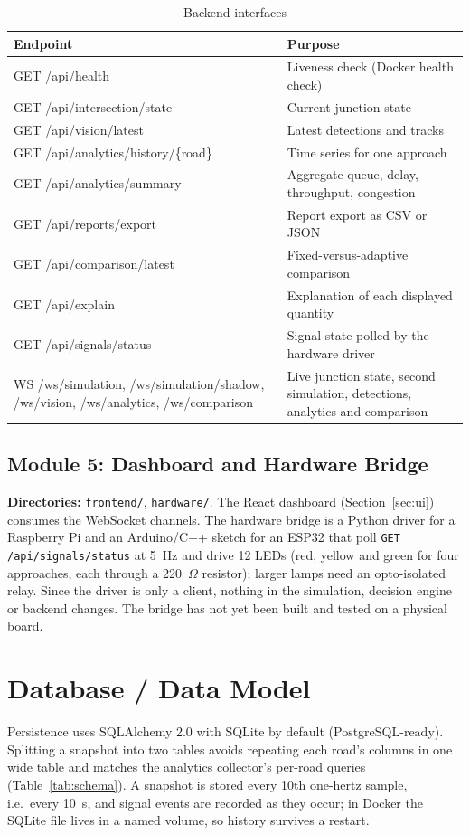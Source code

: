 \begin{table}[H]
\centering
\caption{Backend interfaces}
\label{tab:api}
\small
\begin{tabular}{@{}p{5.6cm}p{9.1cm}@{}}
\toprule
\textbf{Endpoint} & \textbf{Purpose} \\
\midrule
GET /api/health & Liveness check (Docker health check) \\
GET /api/intersection/state & Current junction state \\
GET /api/vision/latest & Latest detections and tracks \\
GET /api/analytics/history/\{road\} & Time series for one approach \\
GET /api/analytics/summary & Aggregate queue, delay, throughput, congestion \\
GET /api/reports/export & Report export as CSV or JSON \\
GET /api/comparison/latest & Fixed-versus-adaptive comparison \\
GET /api/explain & Explanation of each displayed quantity \\
GET /api/signals/status & Signal state polled by the hardware driver \\
WS /ws/simulation, /ws/simulation/shadow, /ws/vision, /ws/analytics, /ws/comparison & Live junction state, second simulation, detections, analytics and comparison \\
\bottomrule
\end{tabular}
\end{table}

\subsection{Module 5: Dashboard and Hardware Bridge}
\textbf{Directories:} \texttt{frontend/}, \texttt{hardware/}. The React dashboard (Section~\ref{sec:ui}) consumes the WebSocket channels. The hardware bridge is a Python driver for a Raspberry Pi and an Arduino/C++ sketch for an ESP32 that poll \texttt{GET /api/signals/status} at 5~Hz and drive 12 LEDs (red, yellow and green for four approaches, each through a 220~$\Omega$ resistor); larger lamps need an opto-isolated relay. Since the driver is only a client, nothing in the simulation, decision engine or backend changes. The bridge has not yet been built and tested on a physical board.

\section{Database / Data Model}
Persistence uses SQLAlchemy 2.0 with SQLite by default (PostgreSQL-ready). Splitting a snapshot into two tables avoids repeating each road's columns in one wide table and matches the analytics collector's per-road queries (Table~\ref{tab:schema}). A snapshot is stored every 10th one-hertz sample, i.e.\ every 10~s, and signal events are recorded as they occur; in Docker the SQLite file lives in a named volume, so history survives a restart.

